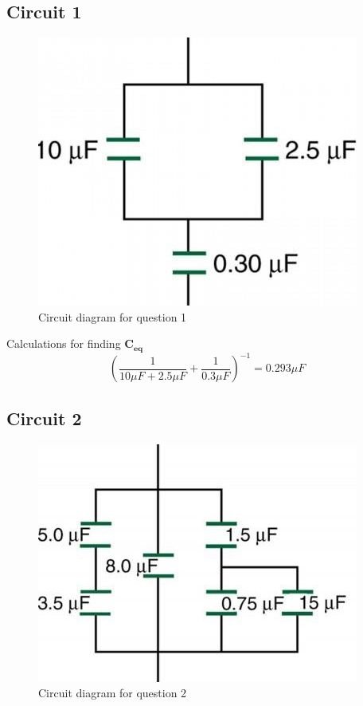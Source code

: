 \documentclass[titlepage]{article}
\begin{document}
    	\subsection{Circuit 1}

        \begin{figure}[hbt!]
            \centering
            \caption{Circuit diagram for question 1}
            \includegraphics{questions/1}
        \end{figure}

    {{Calculations for finding $\mathbf{C_{eq}}$}}
    $$\left( \frac{1}{10\mu F + 2.5 \mu F}+\frac{1}{0.3\mu F} \right)^{-1} = 0.293\mu F$$

    
    	\subsection{Circuit 2}
        \begin{figure}[hbt!]
            \centering
            \caption{Circuit diagram for question 2}
            \includegraphics{questions/2}
        \end{figure}
\end{document}
